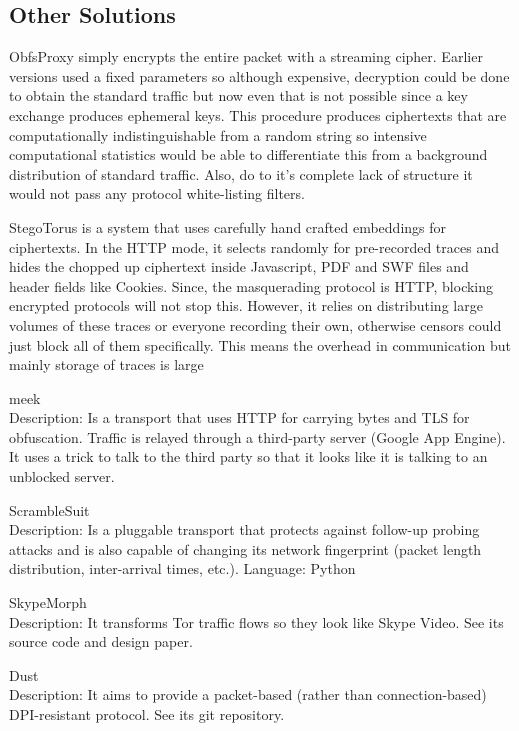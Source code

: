 \documentclass[ %
                    author={Samuel Russell},
                supervisor={Prof. Bogdan Warinschi},
                    degree={MEng},
                     title={Innocuous Ciphertexts},
                  subtitle={The DE-CENSOR Scheme},
                      type={research},
                      year={2018} ]{dissertation}
\begin{document}
\subsection{Other Solutions}

ObfsProxy simply encrypts the entire packet with a streaming cipher. Earlier versions used a fixed parameters so although expensive, decryption could be done to obtain the standard traffic but now even that is not possible since a key exchange produces ephemeral keys. This procedure produces ciphertexts that are computationally indistinguishable from a random string so intensive computational statistics would be able to differentiate this from a background distribution of standard traffic. Also, do to it's complete lack of structure it would not pass any protocol white-listing filters.

StegoTorus is a system that uses carefully hand crafted embeddings for ciphertexts. In the HTTP mode, it selects randomly for pre-recorded traces and hides the chopped up ciphertext inside Javascript, PDF and SWF files and header fields like Cookies. Since, the masquerading protocol is HTTP, blocking encrypted protocols will not stop this. However, it relies on distributing large volumes of these traces or everyone recording their own, otherwise censors could just block all of them specifically. This means the overhead in communication but mainly storage of traces is large 


meek\\
Description: Is a transport that uses HTTP for carrying bytes and TLS for obfuscation. Traffic is relayed through a third-party server (Google App Engine). It uses a trick to talk to the third party so that it looks like it is talking to an unblocked server.

ScrambleSuit\\
Description: Is a pluggable transport that protects against follow-up probing attacks and is also capable of changing its network fingerprint (packet length distribution, inter-arrival times, etc.).
Language: Python

SkypeMorph\\
Description: It transforms Tor traffic flows so they look like Skype Video. See its source code and design paper.

Dust\\
Description: It aims to provide a packet-based (rather than connection-based) DPI-resistant protocol. See its git repository.


\end{document}
